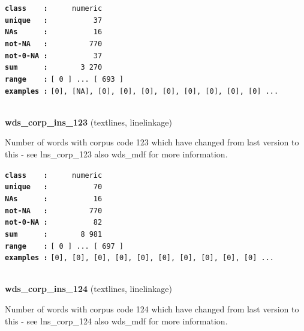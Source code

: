 \documentclass[]{article}
\begin{document}
\textbf{\texttt{class\ \ \ \ :}} \texttt{~~~~~numeric}\\
\textbf{\texttt{unique\ \ \ :}} \texttt{~~~~~~~~~~37}\\
\textbf{\texttt{NAs\ \ \ \ \ \ :}} \texttt{~~~~~~~~~~16}\\
\textbf{\texttt{not-NA\ \ \ :}} \texttt{~~~~~~~~~770}\\
\textbf{\texttt{not-0-NA\ :}} \texttt{~~~~~~~~~~37}\\
\textbf{\texttt{sum\ \ \ \ \ \ :}} \texttt{~~~~~~~3~270}\\
\textbf{\texttt{range\ \ \ \ :}}
\texttt{{[}\ 0\ {]}\ ...\ {[}\ 693\ {]}}\\
\textbf{\texttt{examples\ :}}
\texttt{{[}0{]},\ {[}NA{]},\ {[}0{]},\ {[}0{]},\ {[}0{]},\ {[}0{]},\ {[}0{]},\ {[}0{]},\ {[}0{]},\ {[}0{]}\ ...}\\

~

\textbf{wds\_corp\_ins\_123} (textlines, linelinkage)

Number of words with corpus code 123 which have changed from last
version to this - see lns\_corp\_123 also wds\_mdf for more information.

\textbf{\texttt{class\ \ \ \ :}} \texttt{~~~~~numeric}\\
\textbf{\texttt{unique\ \ \ :}} \texttt{~~~~~~~~~~70}\\
\textbf{\texttt{NAs\ \ \ \ \ \ :}} \texttt{~~~~~~~~~~16}\\
\textbf{\texttt{not-NA\ \ \ :}} \texttt{~~~~~~~~~770}\\
\textbf{\texttt{not-0-NA\ :}} \texttt{~~~~~~~~~~82}\\
\textbf{\texttt{sum\ \ \ \ \ \ :}} \texttt{~~~~~~~8~981}\\
\textbf{\texttt{range\ \ \ \ :}}
\texttt{{[}\ 0\ {]}\ ...\ {[}\ 697\ {]}}\\
\textbf{\texttt{examples\ :}}
\texttt{{[}0{]},\ {[}0{]},\ {[}0{]},\ {[}0{]},\ {[}0{]},\ {[}0{]},\ {[}0{]},\ {[}0{]},\ {[}0{]},\ {[}0{]}\ ...}\\

~

\textbf{wds\_corp\_ins\_124} (textlines, linelinkage)

Number of words with corpus code 124 which have changed from last
version to this - see lns\_corp\_124 also wds\_mdf for more information.
\end{document}
